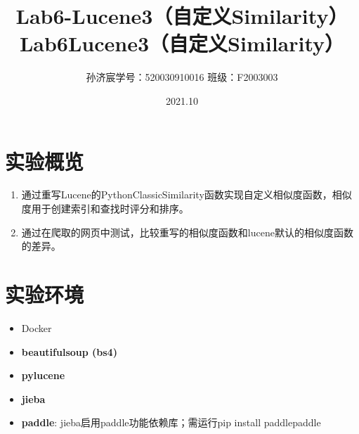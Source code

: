 \documentclass[12pt,a4paper]{article}
\title{Lab6-Lucene3（自定义Similarity）}
\title{Lab6\quad Lucene3（自定义Similarity）}
\date{2021.10}
\author{孙济宸\quad \quad 学号：520030910016 \quad  \quad 班级：F2003003}
\begin{document}
\maketitle
\section{实验概览}
\begin{enumerate}
\item 通过重写Lucene的PythonClassicSimilarity函数实现自定义相似度函数，相似度用于创建索引和查找时评分和排序。
\item 通过在爬取的网页中测试，比较重写的相似度函数和lucene默认的相似度函数的差异。
\end{enumerate}
\section{实验环境}
\begin{itemize}
	\item Docker
	\item \textbf{beautifulsoup (bs4)}
	\item \textbf{pylucene}
	\item \textbf{jieba}
	\item \textbf{paddle}: jieba启用paddle功能依赖库；需运行pip install paddlepaddle

\end{itemize}
\newpage
\end{document}
